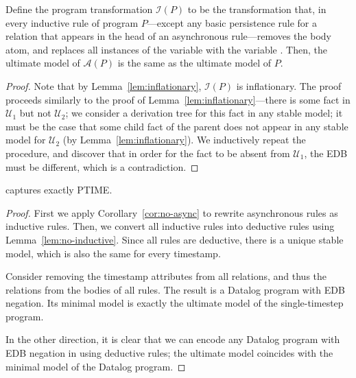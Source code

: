 \begin{lemma}
\label{lem:no-inductive}
Define the program transformation $\mathcal{I}(P)$ to be the transformation that, in every inductive rule of \slang program $P$---except any basic persistence rule for a relation that appears in the head of an asynchronous rule---removes the  body atom, and replaces all instances of the variable  with the variable .  Then, the ultimate model of $\mathcal{A}(P)$ is the same as the ultimate model of $P$.
\end{lemma}
\begin{proof}
Note that by Lemma~\ref{lem:inflationary}, $\mathcal{I}(P)$ is inflationary.  The proof proceeds similarly to the proof of Lemma~\ref{lem:inflationary}---there is some fact in $\mathcal{U}_1$ but not $\mathcal{U}_2$; we consider a derivation tree for this fact in any stable model; it must be the case that some child fact of the parent does not appear in any stable model for $\mathcal{U}_2$ (by Lemma~\ref{lem:inflationary}).  We inductively repeat the procedure, and discover that in order for the fact to be absent from $\mathcal{U}_1$, the EDB must be different, which is a contradiction.
\end{proof}


\begin{theorem}
\label{thm:ptime}
\slang captures exactly PTIME.
\end{theorem}
\begin{proof}
First we apply Corollary~\ref{cor:no-async} to rewrite asynchronous rules as inductive rules.  Then, we convert all inductive rules into deductive rules using Lemma~\ref{lem:no-inductive}.  Since all rules are deductive, there is a unique stable model, which is also the same for every timestamp.

Consider removing the timestamp attributes from all relations, and thus the  relations from the bodies of all rules.  The result is a Datalog program with EDB negation.  Its minimal model is exactly the ultimate model of the single-timestep \slang program.

In the other direction, it is clear that we can encode any Datalog program with EDB negation in \slang using deductive rules; the ultimate model coincides with the minimal model of the Datalog program.
\end{proof}



